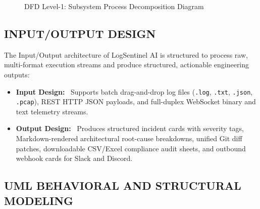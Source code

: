 \documentclass[12pt,a4paper]{article}
\newcommand{\lead}[1]{\textbf{#1}\ }
\begin{document}
\begin{figure}[H]
\centering
{}
\caption{DFD Level-1: Subsystem Process Decomposition Diagram}
\label{fig:dfd_level1}
\end{figure}

\clearpage
\subsection{INPUT/OUTPUT DESIGN}\label{sec:io_design}
The Input/Output architecture of LogSentinel AI is structured to process raw, multi-format execution streams and produce structured, actionable engineering outputs:
\begin{itemize}[leftmargin=1.2em,itemsep=3pt]
    \item \lead{Input Design:} Supports batch drag-and-drop log files (\texttt{.log}, \texttt{.txt}, \texttt{.json}, \texttt{.pcap}), REST HTTP JSON payloads, and full-duplex WebSocket binary and text telemetry streams.
    \item \lead{Output Design:} Produces structured incident cards with severity tags, Markdown-rendered architectural root-cause breakdowns, unified Git diff patches, downloadable CSV/Excel compliance audit sheets, and outbound webhook cards for Slack and Discord.
\end{itemize}

\clearpage
\subsection{UML BEHAVIORAL AND STRUCTURAL MODELING}
\end{document}
